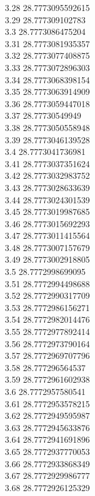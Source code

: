 {3.28	28.7773095592615\\
3.29	28.777309102783\\
3.3	28.7773086475204\\
3.31	28.7773081935357\\
3.32	28.7773077408875\\
3.33	28.7773072896303\\
3.34	28.7773068398154\\
3.35	28.7773063914909\\
3.36	28.7773059447018\\
3.37	28.77730549949\\
3.38	28.7773050558948\\
3.39	28.7773046139528\\
3.4	28.7773041736981\\
3.41	28.7773037351624\\
3.42	28.7773032983752\\
3.43	28.7773028633639\\
3.44	28.7773024301539\\
3.45	28.7773019987685\\
3.46	28.7773015692293\\
3.47	28.7773011415564\\
3.48	28.7773007157679\\
3.49	28.7773002918805\\
3.5	28.7772998699095\\
3.51	28.7772994498688\\
3.52	28.7772990317709\\
3.53	28.7772986156271\\
3.54	28.7772982014476\\
3.55	28.7772977892414\\
3.56	28.7772973790164\\
3.57	28.7772969707796\\
3.58	28.777296564537\\
3.59	28.7772961602938\\
3.6	28.7772957580541\\
3.61	28.7772953578215\\
3.62	28.7772949595987\\
3.63	28.7772945633876\\
3.64	28.7772941691896\\
3.65	28.7772937770053\\
3.66	28.7772933868349\\
3.67	28.7772929986777\\
3.68	28.7772926125329\\
}
